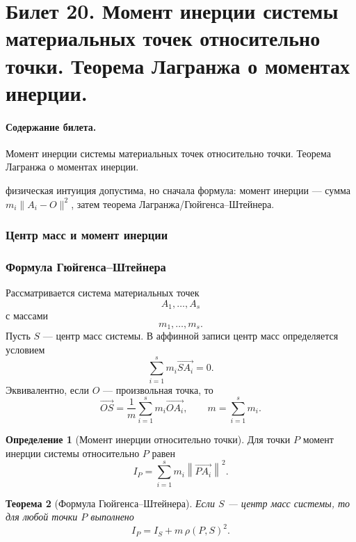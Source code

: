 \documentclass[12pt,a4paper]{article}
\theoremstyle{definition}
\newtheorem{definition}{Определение}[section]
\theoremstyle{plain}
\newtheorem{theorem}[definition]{Теорема}
\theoremstyle{remark}
\newenvironment{planadd}{\begin{planbox}}{\end{planbox}}
\begin{document}
\clearpage

\section{Билет 20. Момент инерции системы материальных точек относительно точки. Теорема Лагранжа о моментах инерции.}

\paragraph{Содержание билета.} Момент инерции системы материальных точек относительно точки. Теорема Лагранжа о моментах инерции.

\begin{planadd}

физическая интуиция допустима, но сначала формула: момент инерции — сумма $m_i\|A_i-O\|^2$, затем теорема Лагранжа/Гюйгенса--Штейнера.

\end{planadd}

\subsubsection{Центр масс и момент инерции}

\subsubsection*{Формула Гюйгенса--Штейнера}

Рассматривается система материальных точек
\[
    A_1,\ldots,A_s
\]
с массами
\[
    m_1,\ldots,m_s.
\]
Пусть $S$ --- центр масс системы. В аффинной записи центр масс определяется условием
\[
    \sum_{i=1}^s m_i\overrightarrow{SA_i}=0.
\]
Эквивалентно, если $O$ --- произвольная точка, то
\[
    \overrightarrow{OS}
    =\frac{1}{m}\sum_{i=1}^s m_i\overrightarrow{OA_i},
    \qquad
    m=\sum_{i=1}^s m_i.
\]

\begin{definition}[Момент инерции относительно точки]
Для точки $P$ момент инерции системы относительно $P$ равен
\[
    I_P=\sum_{i=1}^s m_i\left\lVert\overrightarrow{PA_i}\right\rVert^2.
\]
\end{definition}

\begin{theorem}[Формула Гюйгенса--Штейнера]
Если $S$ --- центр масс системы, то для любой точки $P$ выполнено
\[
    I_P=I_S+m\,\rho(P,S)^2.
\]
\end{theorem}
\end{document}
